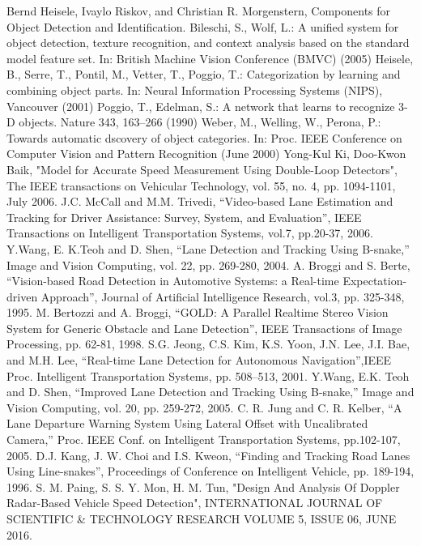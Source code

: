 \documentclass[conference]{IEEEtran}
\begin{document}
\begin{thebibliography}{00}
Bernd Heisele, Ivaylo Riskov, and Christian R. Morgenstern, Components for Object Detection and Identification.
 Bileschi, S., Wolf, L.: A unified system for object detection, texture recognition, and context analysis based on the standard model feature set. In: British Machine Vision Conference (BMVC) (2005)
 Heisele, B., Serre, T., Pontil, M., Vetter, T., Poggio, T.: Categorization by learning and combining object parts. In: Neural Information Processing Systems (NIPS), Vancouver (2001)
 Poggio, T., Edelman, S.: A network that learns to recognize 3-D objects. Nature 343, 163–266 (1990)
 Weber, M., Welling, W., Perona, P.: Towards automatic dscovery of object categories. In: Proc. IEEE Conference on Computer Vision and Pattern Recognition (June 2000)
 Yong-Kul Ki, Doo-Kwon Baik, "Model for Accurate Speed Measurement Using Double-Loop Detectors", The IEEE transactions on Vehicular Technology, vol. 55, no. 4, pp. 1094-1101, July 2006.
 J.C. McCall and M.M. Trivedi, “Video-based Lane
Estimation and Tracking for Driver Assistance: Survey,
System, and Evaluation”, IEEE Transactions on
Intelligent Transportation Systems, vol.7, pp.20-37,
2006.
 Y.Wang, E. K.Teoh and D. Shen, “Lane Detection and
Tracking Using B-snake,” Image and Vision Computing,
vol. 22, pp. 269-280, 2004.
 A. Broggi and S. Berte, “Vision-based Road Detection in Automotive Systems: a Real-time Expectation-driven Approach”, Journal of Artificial Intelligence Research, vol.3, pp. 325-348, 1995.
 M. Bertozzi and A. Broggi, “GOLD: A Parallel Realtime Stereo Vision System for Generic Obstacle and Lane Detection”, IEEE Transactions of Image Processing, pp. 62-81, 1998.
 S.G. Jeong, C.S. Kim, K.S. Yoon, J.N. Lee, J.I. Bae, and M.H. Lee, “Real-time Lane Detection for Autonomous Navigation”,IEEE Proc. Intelligent Transportation Systems, pp. 508–513, 2001.
 Y.Wang, E.K. Teoh and D. Shen, “Improved Lane Detection and Tracking Using B-snake,” Image and Vision Computing, vol. 20, pp. 259-272, 2005.
 C. R. Jung and C. R. Kelber, “A Lane Departure Warning System Using Lateral Offset with Uncalibrated Camera,” Proc. IEEE Conf. on Intelligent Transportation Systems, pp.102-107, 2005.
 D.J. Kang, J. W. Choi and I.S. Kweon, “Finding and Tracking Road Lanes Using Line-snakes”, Proceedings of Conference on Intelligent Vehicle, pp. 189-194, 1996.
 S. M. Paing, S. S. Y. Mon, H. M. Tun, "Design And Analysis Of Doppler Radar-Based Vehicle Speed Detection", INTERNATIONAL JOURNAL OF SCIENTIFIC \& TECHNOLOGY RESEARCH VOLUME 5, ISSUE 06, JUNE 2016.

\end{thebibliography}
\end{document}
